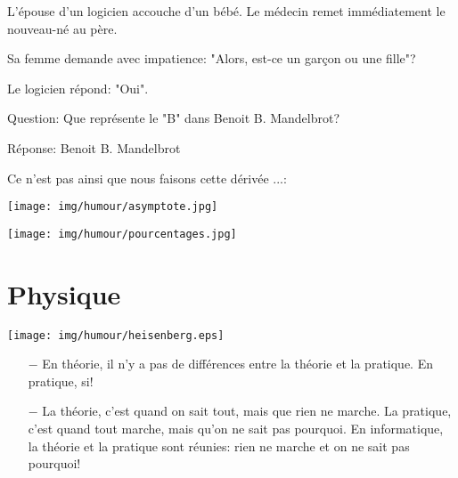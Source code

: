 	L'épouse d'un logicien accouche d'un bébé. Le médecin remet immédiatement le nouveau-né au père.

	Sa femme demande avec impatience: "Alors, est-ce un garçon ou une fille"?

	Le logicien répond: "Oui".

	\begin{center}\underline{\hspace{5 cm}}\end{center}
	
	Question: Que représente le "B" dans Benoit B. Mandelbrot?

	Réponse: Benoit B. Mandelbrot
	
	\begin{center}\underline{\hspace{5 cm}}\end{center}
	
	Ce n'est pas ainsi que nous faisons cette dérivée ...:
	
	
	\begin{center}\underline{\hspace{5 cm}}\end{center}

	\begin{center}
		\texttt{[image: img/humour/asymptote.jpg]}	
	\end{center}
	
	\begin{center}\underline{\hspace{5 cm}}\end{center}
	
	\begin{center}
		\texttt{[image: img/humour/pourcentages.jpg]}	
	\end{center}

	\pagebreak
	\section{Physique}
	
	\begin{center}
	\texttt{[image: img/humour/heisenberg.eps]}
	\end{center}
	
	\begin{center}\underline{\hspace{5 cm}}\end{center}	
	
	\begin{itemize}	 
		\item[$-$] En théorie, il n'y a pas de différences entre la théorie et la pratique. En pratique, si!
	
		\item[$-$] La théorie, c'est quand on sait tout, mais que rien ne marche. La pratique, c'est quand tout marche, mais qu'on ne sait pas pourquoi. En informatique, la théorie et la pratique sont réunies: rien ne marche et on ne sait pas pourquoi!
	\end{itemize}

